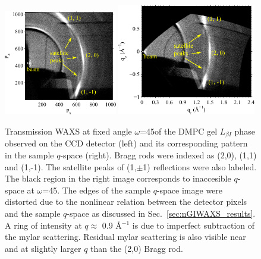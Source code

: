 \begin{figure}[htbp]
  \centering
  \includegraphics[width=0.44\textwidth]{figures/ripple/tWAXS/twaxs_gel_ccd}
  \includegraphics[width=0.54\textwidth]{figures/ripple/tWAXS/twaxs_gel_q}
  \caption[Transmission WAXS of the DMPC gel phase]
  {Transmission WAXS at fixed angle $\omega$=45\textdegree of the DMPC gel 
  $L_{\beta I}$ phase observed on
  the CCD detector (left) and its corresponding pattern in the sample $q$-space
  (right). Bragg rods were indexed as (2,0), (1,1) and (1,-1). The satellite 
  peaks of (1,$\pm$1) reflections were also labeled. The black region in
  the right image corresponds to inaccesible $q$-space at 
  $\omega$=45\textdegree. The edges
  of the sample $q$-space image were distorted due to the nonlinear relation
  between the detector pixels and the sample $q$-space as discussed in 
  Sec.~\ref{sec:nGIWAXS_results}. A ring of intensity
  at $q \approx$ 0.9 \AA$^{-1}$ is due to imperfect subtraction of the mylar
  scattering. Residual mylar scattering is also visible near and at slightly 
  larger $q$ than the (2,0) Bragg rod.}
  \label{fig:twaxs_gel}
\end{figure}

